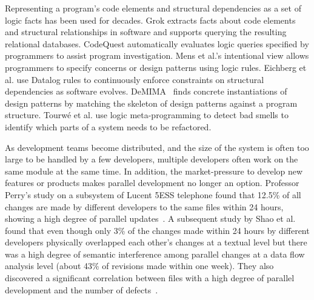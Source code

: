 \documentclass[runningheads,a4paper]{llncs}
\begin{document}
Representing a program's code elements and structural dependencies as a set of logic facts has been used for decades. Grok \cite{Holt1998} extracts facts about code elements and structural relationships in software and supports querying the resulting relational databases. CodeQuest \cite{Hajiyev2006} automatically evaluates logic queries specified by programmers to assist program investigation. Mens et al.'s intentional view \cite{Mens2002b} allows programmers to specify concerns or design patterns using logic rules. Eichberg et al. \cite{Eichberg2008} use Datalog rules to continuously enforce constraints on structural dependencies as software evolves. DeMIMA~\cite{Gueheneuc2008:demima} finds concrete instantiations of design patterns by matching the skeleton of design patterns against a program structure. Tourw{\'e} {et al.} \cite{Tourwe01} use logic meta-programming to detect bad smells to identify which parts of a system needs to be refactored.

As development teams become distributed, and the size of the system is often too large to be handled by a few developers, multiple developers often work on the same module at the same time. In addition, the market-pressure to develop new features or products makes parallel development no longer an option.
Professor Perry's study on a subsystem of Lucent 5ESS telephone found that 12.5\% of all changes are made by different developers to the same files within 24 hours, showing a high degree of parallel updates~\cite{Perry2001:parallel}. A subsequent study by Shao et al. found that even though only 3\% of the changes made within 24 hours by different developers physically overlapped each other's changes at a textual level but there was a high degree of semantic interference among parallel changes at a data flow analysis level (about 43\% of revisions made within one week). They also discovered a significant correlation between files with a high degree of parallel development and the number of defects~\cite{Shao2007:interference}. 

\end{document}

